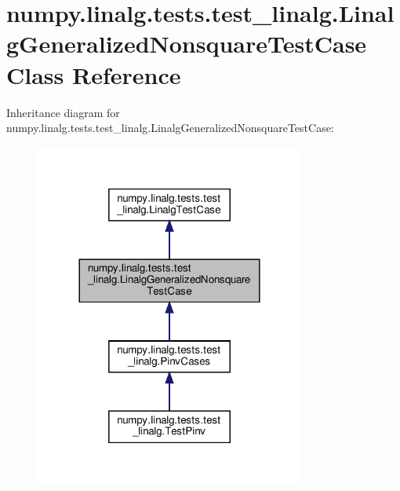 \hypertarget{classnumpy_1_1linalg_1_1tests_1_1test__linalg_1_1LinalgGeneralizedNonsquareTestCase}{}\section{numpy.\+linalg.\+tests.\+test\+\_\+linalg.\+Linalg\+Generalized\+Nonsquare\+Test\+Case Class Reference}
\label{classnumpy_1_1linalg_1_1tests_1_1test__linalg_1_1LinalgGeneralizedNonsquareTestCase}


Inheritance diagram for numpy.\+linalg.\+tests.\+test\+\_\+linalg.\+Linalg\+Generalized\+Nonsquare\+Test\+Case\+:
\nopagebreak
\begin{figure}[H]
\begin{center}
\leavevmode
\includegraphics[width=252pt]{classnumpy_1_1linalg_1_1tests_1_1test__linalg_1_1LinalgGeneralizedNonsquareTestCase__inherit__graph}
\end{center}
\end{figure}


